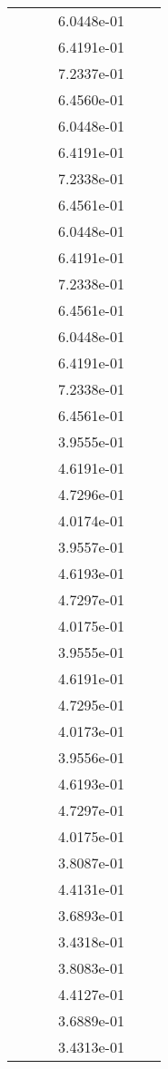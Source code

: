 \begin{xltabular}{\textwidth}{r|rS[table-format=1.3e+2]S[table-format=1.4e+2]S[table-format=1.4e+2]S[table-format=-1.5]}
&  &  & 6.0448e-01 & & \\
&  &  & 6.4191e-01 & & \\
&  &  & 7.2337e-01 & & \\
&  &  & 6.4560e-01 & & \\
&  &  & 6.0448e-01 & & \\
&  &  & 6.4191e-01 & & \\
&  &  & 7.2338e-01 & & \\
&  &  & 6.4561e-01 & & \\
&  &  & 6.0448e-01 & & \\
&  &  & 6.4191e-01 & & \\
&  &  & 7.2338e-01 & & \\
&  &  & 6.4561e-01 & & \\
&  &  & 6.0448e-01 & & \\
&  &  & 6.4191e-01 & & \\
&  &  & 7.2338e-01 & & \\
&  &  & 6.4561e-01 & & \\
&  &  & 3.9555e-01 & & \\
&  &  & 4.6191e-01 & & \\
&  &  & 4.7296e-01 & & \\
&  &  & 4.0174e-01 & & \\
&  &  & 3.9557e-01 & & \\
&  &  & 4.6193e-01 & & \\
&  &  & 4.7297e-01 & & \\
&  &  & 4.0175e-01 & & \\
&  &  & 3.9555e-01 & & \\
&  &  & 4.6191e-01 & & \\
&  &  & 4.7295e-01 & & \\
&  &  & 4.0173e-01 & & \\
&  &  & 3.9556e-01 & & \\
&  &  & 4.6193e-01 & & \\
&  &  & 4.7297e-01 & & \\
&  &  & 4.0175e-01 & & \\
&  &  & 3.8087e-01 & & \\
&  &  & 4.4131e-01 & & \\
&  &  & 3.6893e-01 & & \\
&  &  & 3.4318e-01 & & \\
&  &  & 3.8083e-01 & & \\
&  &  & 4.4127e-01 & & \\
&  &  & 3.6889e-01 & & \\
&  &  & 3.4313e-01 & & \\

\end{xltabular}
